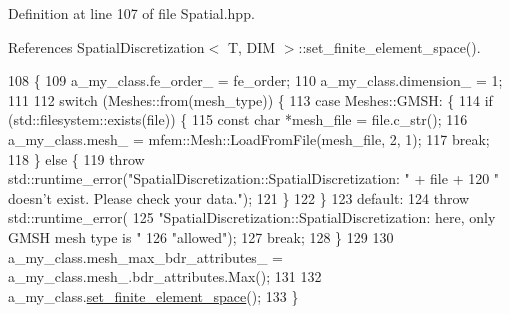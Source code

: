 Definition at line 107 of file Spatial.\+hpp.



References Spatial\+Discretization$<$ T, D\+I\+M $>$\+::set\+\_\+finite\+\_\+element\+\_\+space().


\begin{DoxyCode}
108                                                               \{
109     a\_my\_class.fe\_order\_ = fe\_order;
110     a\_my\_class.dimension\_ = 1;
111 
112     \textcolor{keywordflow}{switch} (Meshes::from(mesh\_type)) \{
113       \textcolor{keywordflow}{case} Meshes::GMSH: \{
114         \textcolor{keywordflow}{if} (std::filesystem::exists(file)) \{
115           \textcolor{keyword}{const} \textcolor{keywordtype}{char} *mesh\_file = file.c\_str();
116           a\_my\_class.mesh\_ = mfem::Mesh::LoadFromFile(mesh\_file, 2, 1);
117           \textcolor{keywordflow}{break};
118         \} \textcolor{keywordflow}{else} \{
119           \textcolor{keywordflow}{throw} std::runtime\_error(\textcolor{stringliteral}{"SpatialDiscretization::SpatialDiscretization: "} + file +
120                                    \textcolor{stringliteral}{" doesn't exist. Please check your data."});
121         \}
122       \}
123       \textcolor{keywordflow}{default}:
124         \textcolor{keywordflow}{throw} std::runtime\_error(
125             \textcolor{stringliteral}{"SpatialDiscretization::SpatialDiscretization: here, only GMSH mesh type is "}
126             \textcolor{stringliteral}{"allowed"});
127         \textcolor{keywordflow}{break};
128     \}
129 
130     a\_my\_class.mesh\_max\_bdr\_attributes\_ = a\_my\_class.mesh\_.bdr\_attributes.Max();
131 
132     a\_my\_class.\hyperlink{classSpatialDiscretization_a8400a265a094312b4d57708d44f9d627}{set\_finite\_element\_space}();
133   \}
\end{DoxyCode}
\mbox{\label{structspecialized__spatial__constructor_3_01T_00_011_01_4_af1e3b2d10b46b73d71983500b594b3f3}} 
